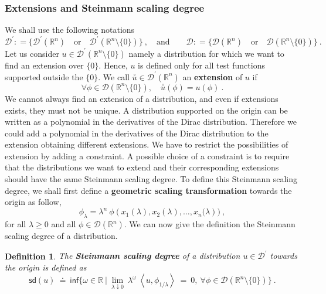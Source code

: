\documentclass[11pt]{book}
\newcommand{\sd}{\mathsf{sd}}
\renewcommand{\inf}{\mathsf{inf}}
\newcommand{\sm}[1]{\left\langle#1\right\rangle}
\newcommand{\exte}[1]{\overset{\circ}{#1}}
\newcommand{\Dcal}{\mathcal{D}}
\newcommand{\Rbb}{\mathbb{R}}
\theoremstyle{break}
\newtheorem{definition}{Definition}[chapter]
\begin{document}
\subsubsection{Extensions and Steinmann scaling degree}


We shall use the following notations
%
\begin{equation*}
\Dcal^\prime : = \bigg\{ \Dcal^\prime(\Rbb^n) \quad \mbox{or} \quad \Dcal^\prime(\Rbb^n\setminus\{0\}) \bigg\} \ , \quad \mbox{and} \qquad \Dcal : = \bigg\{ \Dcal(\Rbb^n) \quad \mbox{or} \quad \Dcal(\Rbb^n\setminus\{0\}) \bigg\} \ .
\end{equation*}
%
Let us consider $u\in \Dcal^\prime(\Rbb^n \setminus \{0\})$ namely a distribution for which we want to find an extension over $\{0\}$. Hence, $u$ is defined only for all test functions supported outside the $\{0\}$. We call $\exte{u} \in \Dcal^\prime(\Rbb^n)$ an \textbf{extension} of $u$ if 
%
\begin{equation*}
 \forall \phi \in \Dcal\left(\Rbb^n \setminus \{0\} \right), \quad \exte{u}(\phi) = u(\phi) \ .
\end{equation*}
%
We cannot always find an extension of a distribution, and even if extensions exists, they must not be unique. A distribution supported on the origin can be written as a polynomial in the derivatives of the Dirac distribution. Therefore we could add a polynomial in the derivatives of the Dirac distribution to the extension obtaining different extensions. We have to restrict the possibilities of extension by adding a constraint. A possible choice of a constraint is to require that the distributions we want to extend and their corresponding extensions should have the same Steinmann scaling degree. To define this Steinmann scaling degree, we shall first define a \textbf{geometric scaling transformation} towards the origin as follow,
%
\begin{equation}
\phi_\lambda = \lambda^{n} \ \phi\left(x_1(\lambda ),x_2(\lambda) , \dots , x_n(\lambda\right)) \ ,
\label{eq:geo_scaling_transfo_numeric}
\end{equation}
%
for all $\lambda \geq 0$ and all $\phi \in \Dcal(\Rbb^n)$. We can now give the definition the Steinmann scaling degree of a distribution.


\begin{definition}\label{def:steinmann_scaling_degree}
The \textbf{Steinmann scaling degree} of a distribution $u \in \Dcal^\prime$ towards the origin is defined as 
%
\begin{equation*}
\sd(u) \ \doteq \ \inf\bigg\{ \omega \in \Rbb \ \bigg| \ \lim_{\lambda \downarrow 0} \ \lambda^\omega \ \sm{u,\phi_{1/\lambda}} \ = \ 0, \ \forall \phi\in\Dcal(\Rbb^n \setminus \{0\}) \bigg\} \ .
\end{equation*}
%
\end{definition}
\end{document}
